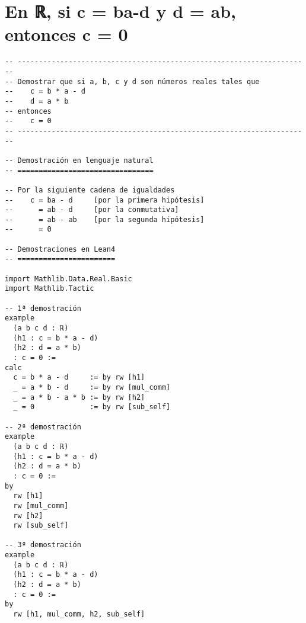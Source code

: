 \section{En ℝ, si c = ba-d y d = ab, entonces c = 0}
\label{sec:org1da5eec}
\begin{verbatim}
-- ---------------------------------------------------------------------
-- Demostrar que si a, b, c y d son números reales tales que
--    c = b * a - d
--    d = a * b
-- entonces
--    c = 0
-- ---------------------------------------------------------------------

-- Demostración en lenguaje natural
-- ================================

-- Por la siguiente cadena de igualdades
--    c = ba - d     [por la primera hipótesis]
--      = ab - d     [por la conmutativa]
--      = ab - ab    [por la segunda hipótesis]
--      = 0

-- Demostraciones en Lean4
-- =======================

import Mathlib.Data.Real.Basic
import Mathlib.Tactic

-- 1ª demostración
example
  (a b c d : ℝ)
  (h1 : c = b * a - d)
  (h2 : d = a * b)
  : c = 0 :=
calc
  c = b * a - d     := by rw [h1]
  _ = a * b - d     := by rw [mul_comm]
  _ = a * b - a * b := by rw [h2]
  _ = 0             := by rw [sub_self]

-- 2ª demostración
example
  (a b c d : ℝ)
  (h1 : c = b * a - d)
  (h2 : d = a * b)
  : c = 0 :=
by
  rw [h1]
  rw [mul_comm]
  rw [h2]
  rw [sub_self]

-- 3ª demostración
example
  (a b c d : ℝ)
  (h1 : c = b * a - d)
  (h2 : d = a * b)
  : c = 0 :=
by
  rw [h1, mul_comm, h2, sub_self]
\end{verbatim}

